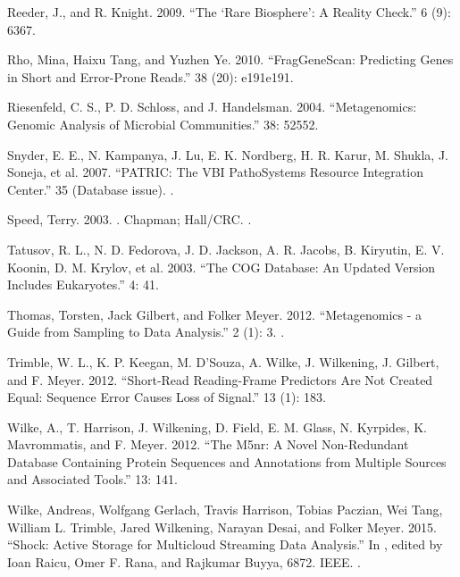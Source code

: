 \documentclass[letterpaper,10pt,english]{sphinxmanual}
\begin{document}
Reeder, J., and R. Knight. 2009. “The ‘Rare Biosphere’: A Reality
Check.”  6 (9): 636\textendash{}7.

Rho, Mina, Haixu Tang, and Yuzhen Ye. 2010. “FragGeneScan:
Predicting Genes in Short and Error-Prone Reads.”  38 (20): e191\textendash{}e191.

Riesenfeld, C. S., P. D. Schloss, and J. Handelsman. 2004.
“Metagenomics: Genomic Analysis of Microbial Communities.”  38: 525\textendash{}52.

Snyder, E. E., N. Kampanya, J. Lu, E. K. Nordberg, H. R. Karur, M.
Shukla, J. Soneja, et al. 2007. “PATRIC: The VBI PathoSystems
Resource Integration Center.”  35 (Database
issue). .

Speed, Terry. 2003. . Chapman; Hall/CRC.
.

Tatusov, R. L., N. D. Fedorova, J. D. Jackson, A. R. Jacobs, B.
Kiryutin, E. V. Koonin, D. M. Krylov, et al. 2003. “The COG
Database: An Updated Version Includes Eukaryotes.”  4: 41.

Thomas, Torsten, Jack Gilbert, and Folker Meyer. 2012.
“Metagenomics - a Guide from Sampling to Data Analysis.”
 2 (1): 3.
.

Trimble, W. L., K. P. Keegan, M. D’Souza, A. Wilke, J. Wilkening,
J. Gilbert, and F. Meyer. 2012. “Short-Read Reading-Frame
Predictors Are Not Created Equal: Sequence Error Causes Loss of
Signal.”  13 (1): 183.

Wilke, A., T. Harrison, J. Wilkening, D. Field, E. M. Glass, N.
Kyrpides, K. Mavrommatis, and F. Meyer. 2012. “The M5nr: A Novel
Non-Redundant Database Containing Protein Sequences and
Annotations from Multiple Sources and Associated Tools.”  13: 141.

Wilke, Andreas, Wolfgang Gerlach, Travis Harrison, Tobias Paczian,
Wei Tang, William L. Trimble, Jared Wilkening, Narayan Desai, and
Folker Meyer. 2015. “Shock: Active Storage for Multicloud
Streaming Data Analysis.” In , edited by Ioan Raicu, Omer F. Rana, and Rajkumar Buyya,
68\textendash{}72. IEEE. .
\end{document}
